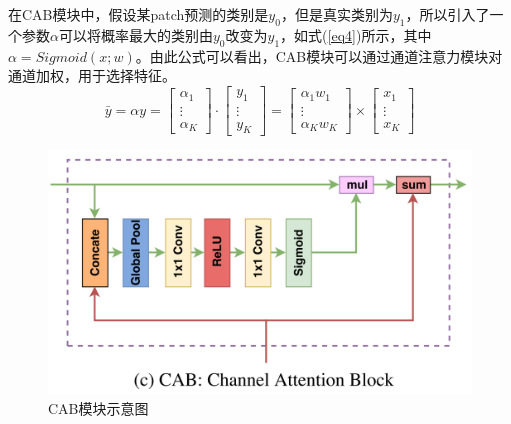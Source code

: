 \documentclass[cn]{elegantbook}
\begin{document}
在CAB模块中，假设某patch预测的类别是$y_0$，但是真实类别为$y_1$，所以引入了一个参数$\alpha$可以将概率最大的类别由$y_0$改变为$y_1$，如式(\ref{eq4})所示，其中$\alpha=Sigmoid(x;w)$。由此公式可以看出，CAB模块可以通过通道注意力模块对通道加权，用于选择特征。
\begin{equation}
\label{eq4}
\bar{y}=\alpha y=\left[\begin{array}{c}
\alpha_1 \\
\vdots \\
\alpha_K
\end{array}\right]\cdot\left[\begin{array}{c}
y_1 \\
\vdots \\
y_K
\end{array}\right]=\left[\begin{array}{c}
\alpha_1w_1 \\
\vdots \\
\alpha_Kw_K
\end{array}\right]\times\left[\begin{array}{c}
x_1 \\
\vdots \\
x_K
\end{array}\right]
\end{equation}
\begin{figure}[!h]
	\centering
	\includegraphics[width=\textwidth]{images/cab}
	\caption{\label{cab}CAB模块示意图}
\end{figure}
\end{document}
